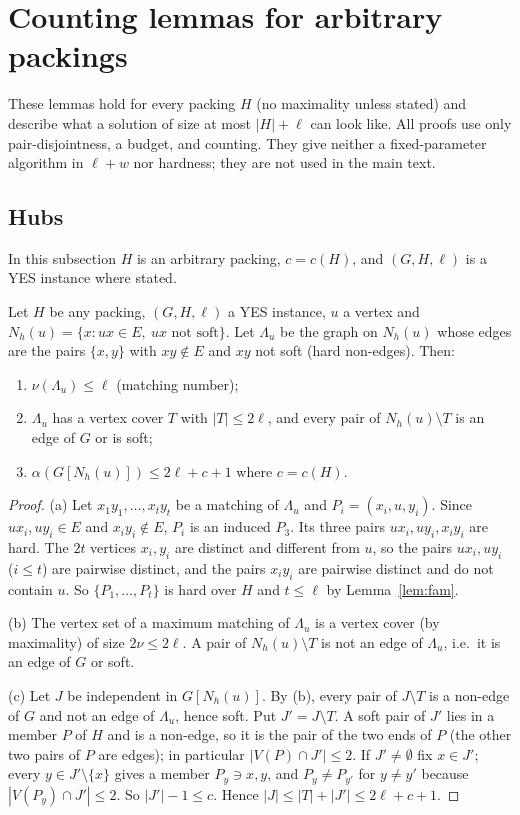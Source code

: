 \section{Counting lemmas for arbitrary packings}\label{app:counting}
These lemmas hold for every packing $H$ (no maximality unless stated) and describe what a solution of size at most $|H|+\ell$ can look like. All proofs use only pair-disjointness, a budget, and counting. They give neither a fixed-parameter algorithm in $\ell+w$ nor hardness; they are not used in the main text.

\subsection{Hubs}
In this subsection $H$ is an arbitrary packing, $c=c(H)$, and $(G,H,\ell)$ is a YES instance where stated.
\begin{lemma}[HUB$^+$]\label{lem:HUB}
Let $H$ be any packing, $(G,H,\ell)$ a YES instance, $u$ a vertex and $N_h(u)=\{x:ux\in E,\ ux\text{ not soft}\}$. Let $\Lambda_u$ be the graph on $N_h(u)$ whose edges are the pairs $\{x,y\}$ with $xy\notin E$ and $xy$ not soft (hard non-edges). Then:
\begin{enumerate}
\item[(a)] $\nu(\Lambda_u)\le\ell$ (matching number);
\item[(b)] $\Lambda_u$ has a vertex cover $T$ with $|T|\le2\ell$, and every pair of $N_h(u)\setminus T$ is an edge of $G$ or is soft;
\item[(c)] $\alpha(G[N_h(u)])\le 2\ell+c+1$ where $c=c(H)$.
\end{enumerate}
\end{lemma}
\begin{proof}
(a) Let $x_1y_1,\dots,x_ty_t$ be a matching of $\Lambda_u$ and $P_i=(x_i,u,y_i)$. Since $ux_i,uy_i\in E$ and $x_iy_i\notin E$, $P_i$ is an induced $P_3$. Its three pairs $ux_i,uy_i,x_iy_i$ are hard. The $2t$ vertices $x_i,y_i$ are distinct and different from $u$, so the pairs $ux_i,uy_i$ ($i\le t$) are pairwise distinct, and the pairs $x_iy_i$ are pairwise distinct and do not contain $u$. So $\{P_1,\dots,P_t\}$ is hard over $H$ and $t\le\ell$ by Lemma~\ref{lem:fam}.

(b) The vertex set of a maximum matching of $\Lambda_u$ is a vertex cover (by maximality) of size $2\nu\le2\ell$. A pair of $N_h(u)\setminus T$ is not an edge of $\Lambda_u$, i.e.\ it is an edge of $G$ or soft.

(c) Let $J$ be independent in $G[N_h(u)]$. By (b), every pair of $J\setminus T$ is a non-edge of $G$ and not an edge of $\Lambda_u$, hence soft. Put $J'=J\setminus T$. A soft pair of $J'$ lies in a member $P$ of $H$ and is a non-edge, so it is the pair of the two ends of $P$ (the other two pairs of $P$ are edges); in particular $|V(P)\cap J'|\le2$. If $J'\ne\emptyset$ fix $x\in J'$; every $y\in J'\setminus\{x\}$ gives a member $P_y\ni x,y$, and $P_y\ne P_{y'}$ for $y\ne y'$ because $|V(P_y)\cap J'|\le2$. So $|J'|-1\le c$. Hence $|J|\le|T|+|J'|\le2\ell+c+1$.
\end{proof}

